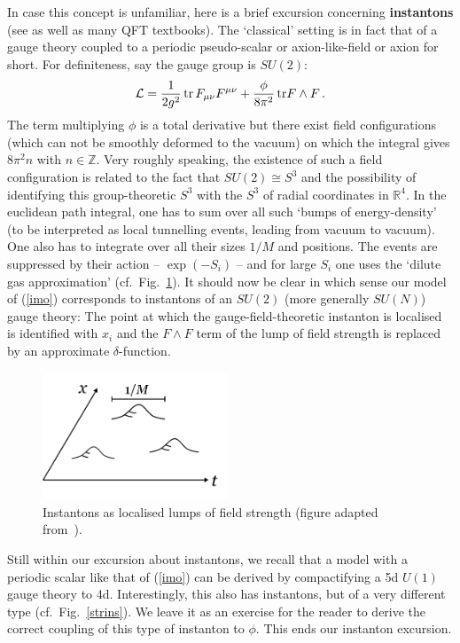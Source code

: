 \documentclass[12pt]{article}
\newcommand{\be}{\begin{equation}}
\newcommand{\ee}{\end{equation}}
\numberwithin{equation}{section}
\begin{document}
In case this concept is unfamiliar, here is a brief excursion concerning {\bf instantons} (see \cite{Coleman:1985rnk, shifman, Blumenhagen:2009qh, Bianchi:2007ft} as well as many QFT textbooks). The `classical' setting is in fact that of a gauge theory coupled to a periodic pseudo-scalar or axion-like-field or axion for short. For definiteness, say the gauge group is $SU(2)$:
\be
{\cal L}=\frac{1}{2g^2}\,\mbox{tr}\,F_{\mu\nu}F^{\mu\nu}+\frac{\phi}{8\pi^2}\, \mbox{tr}F\wedge F\,. 
\ee
The term multiplying $\phi$ is a total derivative but there exist field configurations (which can not be smoothly deformed to the vacuum) on which the integral gives $8\pi^2n$ with $n\in\mathbb{Z}$. Very roughly speaking, the existence of such a field configuration is related to the fact that $SU(2)\cong S^3$ and the possibility of identifying this group-theoretic $S^3$ with the $S^3$ of radial coordinates in $\mathbb{R}^4$. In the euclidean path integral, one has to sum over all such `bumps of energy-density' (to be interpreted as local tunnelling events, leading from vacuum to vacuum). One also has to integrate over all their sizes $1/M$ and positions. The events are suppressed by their action -- $\exp(-S_i)$ -- and for large $S_i$ one uses the `dilute gas approximation' (cf.~Fig.~\ref{instantons}). It should now be clear in which sense our model of (\ref{imo}) corresponds to instantons of an $SU(2)$ (more generally $SU(N)$) gauge theory: The point at which the gauge-field-theoretic instanton is localised is identified with $x_i$ and the $F\wedge F$ term of the lump of field strength is replaced by an approximate $\delta$-function. 

\begin{figure}[ht]
\begin{center} 
\includegraphics[width=5.5cm]{insta.png}
\caption{Instantons as localised lumps of field strength (figure adapted from~\cite{Hebecker:2018ofv}).}
\label{instantons} 
\end{center}
\end{figure}

Still within our excursion about instantons, we recall that a model with a periodic scalar like that of (\ref{imo}) can be derived by compactifying a 5d $U(1)$ gauge theory to 4d. Interestingly, this also has instantons, but of a very different type (cf.~Fig.~\ref{strins}). We leave it as an exercise for the reader to derive the correct coupling of this type of instanton to $\phi$. 
This ends our instanton excursion.
\end{document}
